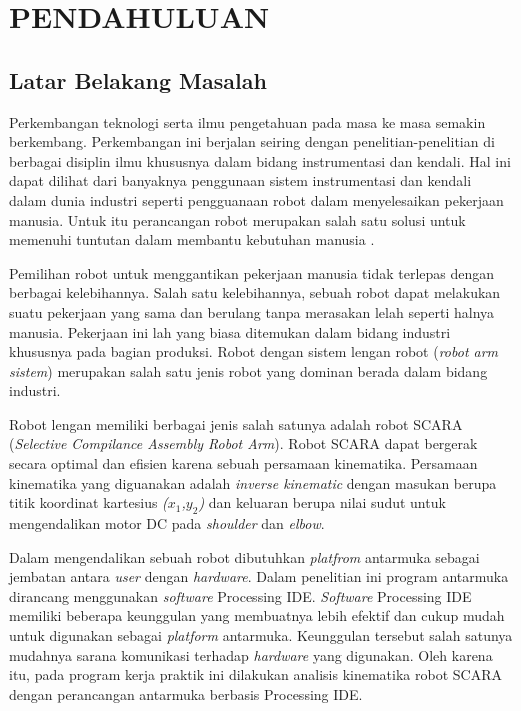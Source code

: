 
\chapter{PENDAHULUAN}

\section{Latar Belakang Masalah}

	Perkembangan teknologi serta ilmu pengetahuan pada masa ke masa semakin berkembang. Perkembangan ini berjalan seiring dengan penelitian-penelitian di berbagai disiplin ilmu khususnya dalam bidang instrumentasi dan kendali. Hal ini dapat dilihat dari banyaknya penggunaan sistem instrumentasi dan kendali dalam dunia industri seperti pengguanaan robot dalam menyelesaikan pekerjaan manusia. Untuk itu perancangan robot merupakan salah satu solusi untuk memenuhi tuntutan dalam membantu kebutuhan manusia \cite{Faris2012}.
	
	Pemilihan robot untuk menggantikan pekerjaan manusia tidak terlepas dengan berbagai kelebihannya. Salah satu kelebihannya, sebuah robot dapat melakukan suatu pekerjaan yang sama dan berulang tanpa merasakan lelah seperti halnya manusia. Pekerjaan ini lah yang biasa ditemukan dalam bidang industri khususnya pada bagian produksi. Robot dengan sistem lengan robot (\emph {robot arm sistem}) merupakan salah satu jenis robot yang dominan berada dalam bidang industri\cite{Bimantaka2014}. 
	
	Robot lengan memiliki berbagai jenis salah satunya adalah robot SCARA (\emph{Selective Compilance Assembly Robot Arm}). Robot SCARA dapat bergerak secara optimal dan efisien karena sebuah persamaan kinematika. Persamaan kinematika yang diguanakan adalah \textit{inverse kinematic} dengan masukan berupa titik koordinat kartesius \textit{($x_{1}$,$y_{2}$)} dan keluaran berupa nilai sudut untuk mengendalikan motor DC pada \textit{shoulder} dan \textit{elbow}.
	
	Dalam mengendalikan sebuah robot dibutuhkan \textit{platfrom} antarmuka sebagai jembatan antara \textit{user} dengan \emph{hardware}. Dalam penelitian ini program antarmuka dirancang menggunakan \textit{software} Processing IDE. \emph{Software} Processing IDE memiliki beberapa keunggulan yang membuatnya lebih efektif dan cukup mudah untuk digunakan sebagai \textit{platform} antarmuka. Keunggulan tersebut salah satunya mudahnya sarana komunikasi terhadap \emph {hardware} yang digunakan. Oleh karena itu, pada program kerja praktik ini dilakukan analisis kinematika robot SCARA dengan perancangan antarmuka berbasis  Processing IDE.\\


